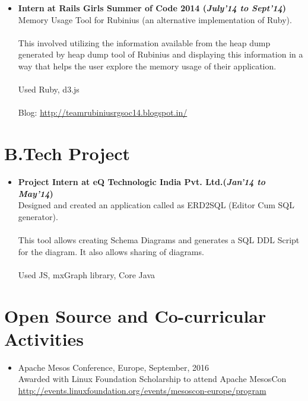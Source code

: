 \documentclass[margin,line]{res}
\begin{document}
\begin{resume}
\begin{itemize}
\item \textbf{Intern at Rails Girls Summer of Code 2014 (\emph{July'14 to Sept'14})}\\
Memory Usage Tool for Rubinius (an alternative implementation of Ruby).\\\\
This involved utilizing the information available from the heap dump generated by heap dump tool of Rubinius and displaying this information
in a way that helps the user explore the memory usage of their application.\\\\
Used Ruby, d3.js\\\\
Blog: \url{http://teamrubiniusrgsoc14.blogspot.in/}


\end{itemize}


\section{B.Tech Project}
\begin{itemize} \itemsep -4pt

\item \textbf{Project Intern at eQ Technologic India Pvt. Ltd.(\emph{Jan'14 to May'14})}\\
Designed and created an application called as ERD2SQL (Editor Cum SQL generator).\\\\
This tool allows creating Schema Diagrams and generates a SQL DDL Script for the diagram. It also allows sharing of diagrams.\\\\
Used JS, mxGraph library, Core Java

\end{itemize}

\section{Open Source and Co-curricular Activities}
\begin{itemize} \itemsep -4pt

\item {Apache Mesos Conference, Europe, September, 2016}\\
Awarded with Linux Foundation Scholarship to attend Apache MesosCon\\
\url{http://events.linuxfoundation.org/events/mesoscon-europe/program}\\


\end{itemize}
\end{resume}
\end{document}

